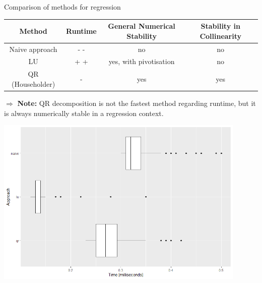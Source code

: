 \documentclass[11pt,compress,t,notes=noshow, xcolor=table]{beamer}
\begin{document}
\begin{vbframe}{Comparison of methods for regression}

\begin{footnotesize}
\begin{table}
\centering
\begin{tabular}{c|c|c|c}
Method                    & Runtime         & General Numerical Stability & Stability in Collinearity\\
\hline
Naive approach            &   - -           & no                        & no \\
LU                        &   + +           & yes, with pivotisation    & no \\
QR (Householder)          &   -             & yes                       & yes\\

\end{tabular}
\end{table}
\end{footnotesize}

\lz

$\Rightarrow$ \textbf{Note:} QR decomposition is not the fastest method regarding runtime, but it is always numerically stable in a regression context.

\framebreak

\lz


\begin{center}
\includegraphics[width = 0.9\textwidth]{figure_man/method_comparison.png} 
\end{center}

% 
% 

\end{vbframe}
\end{document}
